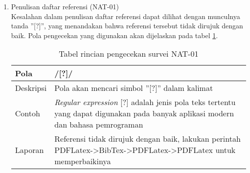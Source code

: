 \begin{enumerate}
	\item Penulisan daftar referensi (NAT-01) \\
	Kesalahan dalam penulisan daftar referensi dapat dilihat dengan munculnya tanda ''[?]'', yang menandakan bahwa referensi tersebut tidak dirujuk dengan baik. Pola pengecekan yang digunakan akan dijelaskan pada tabel \ref{tab:nat01}.
		
	\begin{table}[H]
		\renewcommand{\arraystretch}{1.5}
		\caption {Tabel rincian pengecekan survei NAT-01} 
		\label{tab:nat01}
		\begin{center}
			\begin{tabular}{|p{3.5cm} |p{10.5cm}|}
			\hline 
			Pola & /[?]/ \\ 
			\hline 
			Deskripsi & Pola akan mencari simbol ''[?]'' dalam kalimat \\ 
			\hline 
			Contoh & \textit{Regular expression} [?] adalah jenis pola teks tertentu yang dapat digunakan pada banyak aplikasi modern dan bahasa pemrograman \\ 
			\hline 
			Laporan & Referensi tidak dirujuk dengan baik, lakukan perintah PDFLatex->BibTex->PDFLatex->PDFLatex untuk memperbaikinya\\ 
			\hline
			\end{tabular}
		\end{center}
	\end{table}
	
\end{enumerate}